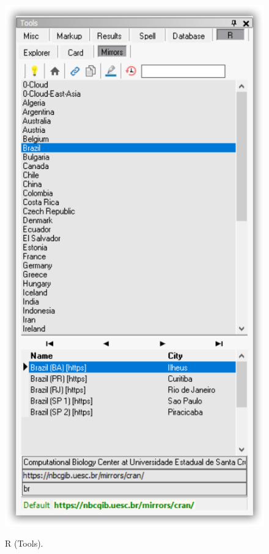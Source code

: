 \begin{figure}[H]
  \includegraphics[scale=0.35]{./res/tools_r_mirrors.png}\\
  \caption{R (Tools).}
  \label{fig:tools_r}
\end{figure}

